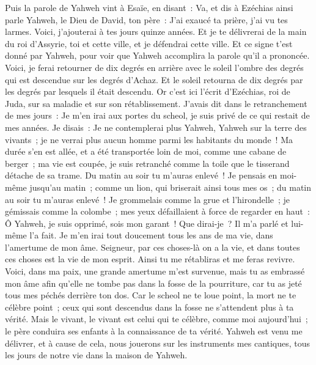 \begin{multicols}{2}
Puis la parole de Yahweh vint à Esaïe, en disant~:
Va, et dis à Ezéchias ainsi parle Yahweh, le Dieu de David, ton père~: J'ai exaucé ta prière, j'ai vu tes larmes. Voici, j'ajouterai à tes jours quinze années.
Et je te délivrerai de la main du roi d'Assyrie, toi et cette ville, et je défendrai cette ville.
Et ce signe t'est donné par Yahweh, pour voir que Yahweh accomplira la parole qu'il a prononcée.
Voici, je ferai retourner de dix degrés en arrière avec le soleil l'ombre des degrés qui est descendue sur les degrés d'Achaz. Et le soleil retourna de dix degrés par les degrés par lesquels il était descendu.
Or c'est ici l'écrit d'Ezéchias, roi de Juda, sur sa maladie et sur son rétablissement.
J'avais dit dans le retranchement de mes jours~: Je m'en irai aux portes du scheol, je suis privé de ce qui restait de mes années.
Je disais~: Je ne contemplerai plus Yahweh, Yahweh sur la terre des vivants~; je ne verrai plus aucun homme parmi les habitants du monde~!
Ma durée s'en est allée, et a été transportée loin de moi, comme une cabane de berger~; ma vie est coupée, je suis retranché comme la toile que le tisserand détache de sa trame. Du matin au soir tu m'auras enlevé~!
Je pensais en moi-même jusqu'au matin~; comme un lion, qui briserait ainsi tous mes os~; du matin au soir tu m'auras enlevé~!
Je grommelais comme la grue et l'hirondelle~; je gémissais comme la colombe~; mes yeux défaillaient à force de regarder en haut~: Ô Yahweh, je suis opprimé, sois mon garant~!
Que dirai-je~? Il m'a parlé et lui-même l'a fait. Je m'en irai tout doucement tous les ans de ma vie, dans l'amertume de mon âme.
Seigneur, par ces choses-là on a la vie, et dans toutes ces choses est la vie de mon esprit. Ainsi tu me rétabliras et me feras revivre.
Voici, dans ma paix, une grande amertume m'est survenue, mais tu as embrassé mon âme afin qu'elle ne tombe pas dans la fosse de la pourriture, car tu as jeté tous mes péchés derrière ton dos.
Car le scheol ne te loue point, la mort ne te célèbre point~; ceux qui sont descendus dans la fosse ne s'attendent plus à ta vérité.
Mais le vivant, le vivant est celui qui te célèbre, comme moi aujourd'hui~; le père conduira ses enfants à la connaissance de ta vérité.
Yahweh est venu me délivrer, et à cause de cela, nous jouerons sur les instruments mes cantiques, tous les jours de notre vie dans la maison de Yahweh.

\end{multicols}

